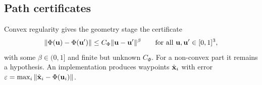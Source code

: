 \subsection{Path certificates}
\label{sec:vsfc-certificates}
\label{sec:vsfc-construction}

Convex regularity gives the geometry stage the certificate
\begin{equation}
  \label{eq:vsfc-holder}
  \|\Phi({\bm{\mathrm{u}}})-\Phi({\bm{\mathrm{u}}}')\|\leq C_\Phi\|{\bm{\mathrm{u}}}-{\bm{\mathrm{u}}}'\|^\beta
  \qquad\text{for all }{\bm{\mathrm{u}}},{\bm{\mathrm{u}}}'\in[0,1]^3,
\end{equation}
with some $\beta\in(0,1]$ and finite but unknown $C_\Phi$. For a non-convex part it remains a hypothesis. An implementation produces waypoints $\hat {\bm{\mathrm{x}}}_i$ with error $\varepsilon=\max_i\|\hat {\bm{\mathrm{x}}}_i-\Phi({\bm{\mathrm{u}}}_i)\|$.

